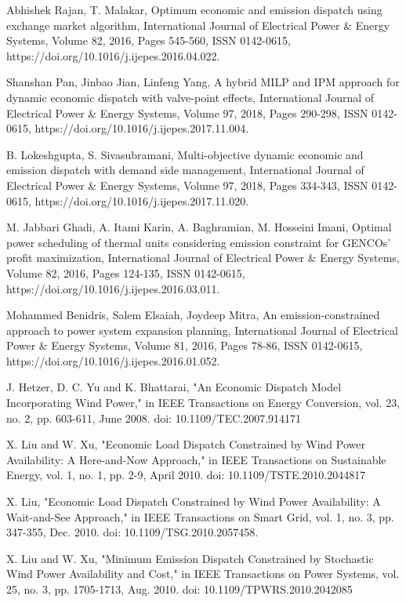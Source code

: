 \begin{thebibliography}{99}
\begin{singlespace}
 Abhishek Rajan, T. Malakar, Optimum economic and emission dispatch using exchange market algorithm, International Journal of Electrical Power \& Energy Systems, Volume 82, 2016, Pages 545-560, ISSN 0142-0615, https://doi.org/10.1016/j.ijepes.2016.04.022.

 Shanshan Pan, Jinbao Jian, Linfeng Yang, A hybrid MILP and IPM approach for dynamic economic dispatch with valve-point effects, International Journal of Electrical Power \& Energy Systems, Volume 97, 2018, Pages 290-298, ISSN 0142-0615, https://doi.org/10.1016/j.ijepes.2017.11.004.

B. Lokeshgupta, S. Sivasubramani, Multi-objective dynamic economic and emission dispatch with demand side management, International Journal of Electrical Power \& Energy Systems, Volume 97, 2018, Pages 334-343, ISSN 0142-0615, https://doi.org/10.1016/j.ijepes.2017.11.020.

 M. Jabbari Ghadi, A. Itami Karin, A. Baghramian, M. Hosseini Imani, Optimal power scheduling of thermal units considering emission constraint for GENCOs’ profit maximization, International Journal of Electrical Power \& Energy Systems, Volume 82, 2016, Pages 124-135, ISSN 0142-0615, https://doi.org/10.1016/j.ijepes.2016.03.011.

 Mohammed Benidris, Salem Elsaiah, Joydeep Mitra, An emission-constrained approach to power system expansion planning, International Journal of Electrical Power \& Energy Systems, Volume 81, 2016, Pages 78-86, ISSN 0142-0615, https://doi.org/10.1016/j.ijepes.2016.01.052.

 J. Hetzer, D. C. Yu and K. Bhattarai, "An Economic Dispatch Model Incorporating Wind Power," in IEEE Transactions on Energy Conversion, vol. 23, no. 2, pp. 603-611, June 2008. doi: 10.1109/TEC.2007.914171

 X. Liu and W. Xu, "Economic Load Dispatch Constrained by Wind Power Availability: A Here-and-Now Approach," in IEEE Transactions on Sustainable Energy, vol. 1, no. 1, pp. 2-9, April 2010. doi: 10.1109/TSTE.2010.2044817 

 X. Liu, "Economic Load Dispatch Constrained by Wind Power Availability: A Wait-and-See Approach," in IEEE Transactions on Smart Grid, vol. 1, no. 3, pp. 347-355, Dec. 2010. doi: 10.1109/TSG.2010.2057458.

X. Liu and W. Xu, "Minimum Emission Dispatch Constrained by Stochastic Wind Power Availability and Cost," in IEEE Transactions on Power Systems, vol. 25, no. 3, pp. 1705-1713, Aug. 2010. doi: 10.1109/TPWRS.2010.2042085


\end{singlespace}
\end{thebibliography}
